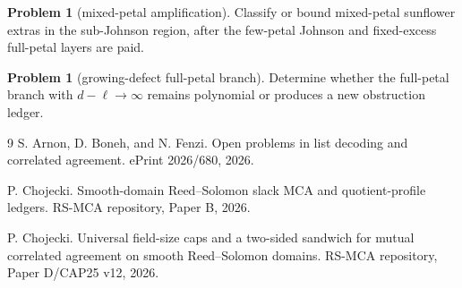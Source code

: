 \documentclass[11pt]{article}
\theoremstyle{definition}
\newtheorem{problem}[theorem]{Problem}
\theoremstyle{remark}
\begin{document}
\begin{problem}[mixed-petal amplification]
Classify or bound mixed-petal sunflower extras in the sub-Johnson region, after
the few-petal Johnson and fixed-excess full-petal layers are paid.
\end{problem}

\begin{problem}[growing-defect full-petal branch]
Determine whether the full-petal branch with $d-\ell\to\infty$ remains
polynomial or produces a new obstruction ledger.
\end{problem}

\begin{thebibliography}{9}
S. Arnon, D. Boneh, and N. Fenzi.
\newblock Open problems in list decoding and correlated agreement.
\newblock ePrint 2026/680, 2026.

P. Chojecki.
\newblock Smooth-domain Reed--Solomon slack MCA and quotient-profile ledgers.
\newblock RS-MCA repository, Paper B, 2026.

P. Chojecki.
\newblock Universal field-size caps and a two-sided sandwich for mutual
correlated agreement on smooth Reed--Solomon domains.
\newblock RS-MCA repository, Paper D/CAP25 v12, 2026.
\end{thebibliography}
\end{document}
